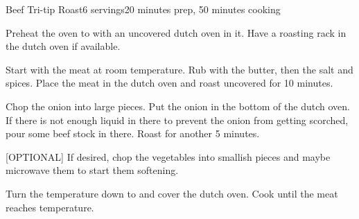 \documentclass[../Cookbook.tex]{subfiles}
\begin{document}
\begin{recipe}{Beef Tri-tip Roast}{6 servings}{20 minutes prep, 50 minutes cooking}

	Preheat the oven to  with an uncovered dutch oven in it. Have a roasting rack in the dutch oven if available.

	Start with the meat at room temperature. Rub with the butter, then the salt and spices. Place the meat in the dutch oven and roast uncovered for 10 minutes.

	Chop the onion into large pieces. Put the onion in the bottom of the dutch oven. If there is not enough liquid in there to prevent the onion from getting scorched, pour some beef stock in there. Roast for another 5 minutes.

	[OPTIONAL] If desired, chop the vegetables into smallish pieces and maybe microwave them to start them softening.

	\newstep
	Turn the temperature down to  and cover the dutch oven. Cook until the meat reaches temperature.

\end{recipe}
\end{document}
